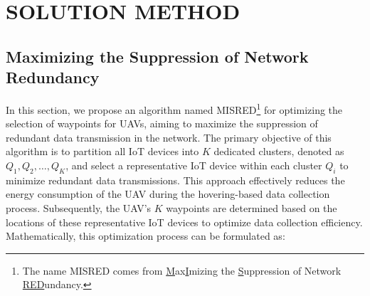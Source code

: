 \documentclass[sigconf]{acmart}
\begin{document}
\section{SOLUTION METHOD}



\subsection{Maximizing the Suppression of Network Redundancy}



In this section, we propose an algorithm named MISRED\footnote{The name MISRED comes from \underline{M}ax\underline{I}mizing the \underline{S}uppression of Network \underline{RED}undancy.} for optimizing the selection of waypoints for UAVs, aiming to maximize the suppression of redundant data transmission in the network. The primary objective of this algorithm is to partition all IoT devices into $K$ dedicated clusters, denoted as $Q_1, Q_2, \dots, Q_K$, and select a representative IoT device within each cluster $Q_i$ to minimize redundant data transmissions. This approach effectively reduces the energy consumption of the UAV during the hovering-based data collection process. Subsequently, the UAV's $K$ waypoints are determined based on the locations of these representative IoT devices to optimize data collection efficiency. Mathematically, this optimization process can be formulated as:
\end{document}
